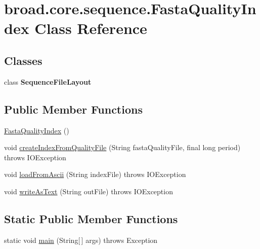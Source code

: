 \hypertarget{classbroad_1_1core_1_1sequence_1_1_fasta_quality_index}{\section{broad.\+core.\+sequence.\+Fasta\+Quality\+Index Class Reference}
\label{classbroad_1_1core_1_1sequence_1_1_fasta_quality_index}
}
\subsection*{Classes}
\begin{DoxyCompactItemize}
\item 
class {\bfseries Sequence\+File\+Layout}
\end{DoxyCompactItemize}
\subsection*{Public Member Functions}
\begin{DoxyCompactItemize}
\item 
\hyperlink{classbroad_1_1core_1_1sequence_1_1_fasta_quality_index_a0d8d182df9a8f3efe12da48eceb23f3e}{Fasta\+Quality\+Index} ()
\item 
void \hyperlink{classbroad_1_1core_1_1sequence_1_1_fasta_quality_index_a0676d9e369196ce9eb7e7875006afe6a}{create\+Index\+From\+Quality\+File} (String fasta\+Quality\+File, final long period)  throws I\+O\+Exception 
\item 
void \hyperlink{classbroad_1_1core_1_1sequence_1_1_fasta_quality_index_ad9f12db2b6bb53c11e6f0a8cfe66eed2}{load\+From\+Ascii} (String index\+File)  throws I\+O\+Exception 
\item 
void \hyperlink{classbroad_1_1core_1_1sequence_1_1_fasta_quality_index_a03d684d569863d5a842eb509ada64411}{write\+As\+Text} (String out\+File)  throws I\+O\+Exception 
\end{DoxyCompactItemize}
\subsection*{Static Public Member Functions}
\begin{DoxyCompactItemize}
\item 
static void \hyperlink{classbroad_1_1core_1_1sequence_1_1_fasta_quality_index_ac885c7baf5be7b8129380877d6d2c7e2}{main} (String\mbox{[}$\,$\mbox{]} args)  throws Exception 
\end{DoxyCompactItemize}



